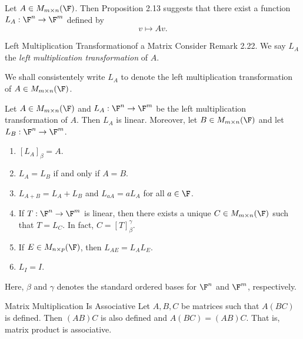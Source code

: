\documentclass[linearalgebra]{subfiles}
\begin{document}
    \begin{remark}
        Let $A\in M_{m\times n}(\F)$. Then Proposition 2.13 suggests that there exist a function $L_A:\F^n\to\F^m$ defined by
        \begin{equation*}
            v\mapsto Av.
        \end{equation*}
    \end{remark}

    \begin{definition}{Left Multiplication Transformation}{of a Matrix}
        Consider Remark 2.22. We say $L_A$ the \emph{left multiplication transformation} of $A$.
    \end{definition}

    \begin{remark}
        We shall consistentely write $L_A$ to denote the left multiplication transformation of $A\in M_{m\times n}(\F)$. 
    \end{remark}

    \begin{prop}{}
        Let $A\in M_{m\times n}(\F)$ and $L_A:\F^n\to\F^m$ be the left multiplication transformation of $A$. Then $L_A$ is linear. Moreover, let $B\in M_{m\times n}(\F)$ and let $L_B:\F^n\to\F^m$.  
        \begin{enumerate}
            \item $\left[ L_A \right] _\beta = A$.
            \item $L_A = L_B$ if and only if $A=B$.
            \item $L_{A+B} = L_A+L_B$ and $L_{aA} = aL_A$ for all $a\in\F$.
            \item If $T:\F^n\to\F^m$ is linear, then there exists a unique $C\in M_{m\times n}(\F)$ such that $T=L_C$. In fact, $C=\left[ T \right] ^\gamma_\beta$. 
            \item If $E\in M_{n\times p}(\F)$, then $L_{AE} = L_AL_E$.
            \item $L_I = I$.
        \end{enumerate}
        Here, $\beta$ and $\gamma$ denotes the standard ordered bases for $\F^n$ and $\F^m$, respectively.
    \end{prop}

    \clearpage
    \begin{prop}{Matrix Multiplication Is Associative}
        Let $A, B, C$ be matrices such that $A(BC)$ is defined. Then $(AB)C$ is also defined and $A(BC) = (AB)C$. That is, matrix product is associative.
    \end{prop}
\end{document}
